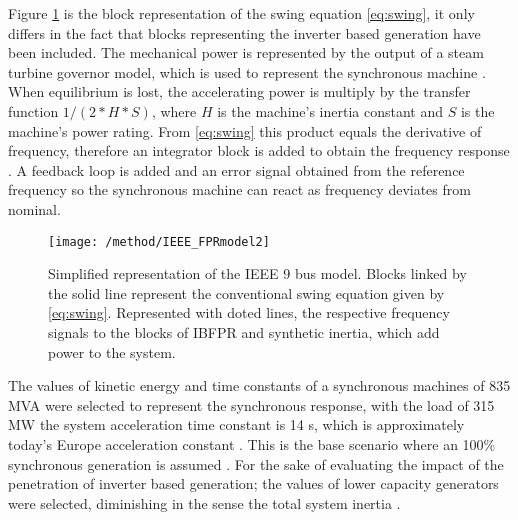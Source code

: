 Figure \ref{fig:ieeesimple} is the block representation of the swing equation \eqref{eq:swing}, it only differs in the fact that blocks representing the inverter based generation have been included. The mechanical power is represented by the output of a steam turbine governor model, which is used to represent the synchronous machine \cite{Anderson.2002}. When equilibrium is lost, the accelerating power is multiply by the transfer function $ 1/(2*H*S) $, where $ H $ is the machine’s inertia constant and $ S $ is the machine’s power rating. From \eqref{eq:swing} this product equals the derivative of frequency, therefore an integrator block is added to obtain the frequency response \cite{kundur1994power}\cite{john1994power}\cite{ogata1999ingenieria}. A feedback loop is added and an error signal obtained from the reference frequency so the synchronous machine can react as frequency deviates from nominal. \\

\begin{figure}[h]
	\centering
	\texttt{[image: /method/IEEE\_FPRmodel2]}
	\caption{Simplified representation of the IEEE 9 bus model. Blocks linked by the solid line represent the conventional swing equation given by \eqref{eq:swing}. Represented with doted lines, the respective frequency signals to the blocks of IBFPR and synthetic inertia, which add power to the system.}
	\label{fig:ieeesimple}
\end{figure}


The values of kinetic energy and time constants of a synchronous machines of 835 MVA were selected to represent the synchronous response, with the load of 315 MW the system acceleration time constant is 14 s, which is approximately today’s Europe acceleration constant \cite{ENTSOE.2016}. This is the base scenario where an 100\% synchronous generation is assumed . For the sake of evaluating the impact of the penetration of inverter based generation; the values of lower capacity generators were selected, diminishing in the sense the total system inertia \cite{Anderson.2002}.\\%





